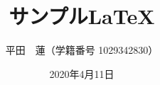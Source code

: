 \documentclass[a4j]{jsarticle}
\begin{document}
\title{サンプル\LaTeX}
\author{平田　蓮（学籍番号 1029342830）}
\date{2020年4月11日}
\maketitle



\begin{thebibliography}{99}
\end{thebibliography}
\end{document}
